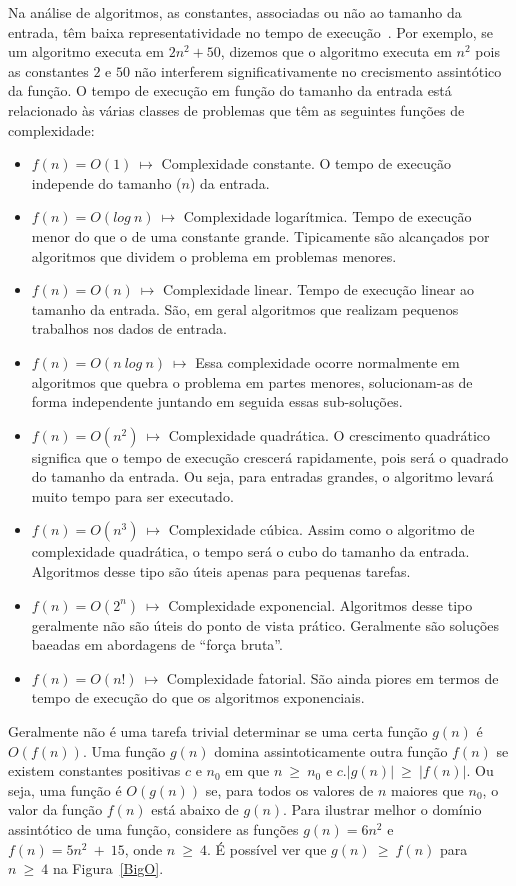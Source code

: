 \documentclass[11pt,fleqn]{book} %
\begin{document}
Na análise de algoritmos, as constantes, associadas ou não ao tamanho da entrada, têm baixa representatividade no tempo de execução~\cite{manber1989}.
Por exemplo, se um algoritmo executa em $2n^2+50$, dizemos que o algoritmo executa em $n^2$ pois as constantes $2$ e $50$ não interferem significativamente no crecismento assintótico da função.
O tempo de execução em função do tamanho da entrada está relacionado às várias classes de problemas que têm as seguintes funções de complexidade:
\begin{itemize}
\item $f(n) = O(1)~\mapsto$ Complexidade constante. O tempo de execução independe do tamanho ($n$) da entrada.
\item $f(n) = O(log~n)~\mapsto$ Complexidade logarítmica. Tempo de execução menor do que o de uma constante grande. Tipicamente são alcançados por algoritmos que dividem o problema em problemas menores.
\item $f(n) = O(n)~\mapsto$ Complexidade linear. Tempo de execução linear ao tamanho da entrada. São, em geral algoritmos que realizam pequenos trabalhos nos dados de entrada.
\item $f(n) = O(n~log~n)~\mapsto$ Essa complexidade ocorre normalmente em algoritmos que quebra o problema em partes menores, solucionam-as de forma independente juntando em seguida essas sub-soluções.
\item $f(n) = O(n^2)~\mapsto$ Complexidade quadrática. O crescimento quadrático significa que o tempo de execução crescerá rapidamente, pois será o quadrado do tamanho da entrada. Ou seja, para entradas grandes, o algoritmo levará muito tempo para ser executado.
\item $f(n) = O(n^3)~\mapsto$ Complexidade cúbica. Assim como o algoritmo de complexidade quadrática,  o tempo será o cubo do tamanho da entrada. Algoritmos desse tipo são úteis apenas para pequenas tarefas.
\item $f(n) = O(2^n)~\mapsto$ Complexidade exponencial. Algoritmos desse tipo geralmente não são úteis do ponto de vista prático. Geralmente são soluções baeadas em abordagens de ``força bruta''.
\item $f(n) = O(n!)~\mapsto$ Complexidade fatorial. São ainda piores em termos de tempo de execução do que os algoritmos exponenciais.
\end{itemize}

Geralmente não é uma tarefa trivial determinar se uma certa função $g(n)$ é $O(f(n))$.
Uma função $g(n)$ domina assintoticamente outra função $f(n)$ se existem constantes positivas $c$ e $n_0$ em que $n~\geq~n_0$ e $c.|g(n)|~\geq~|f(n)|$.
Ou seja, uma função é $O(g(n))$ se, para todos os valores de $n$ maiores que $n_0$, o valor da função $f(n)$ está abaixo de $g(n)$.
Para ilustrar melhor o domínio assintótico de uma função, considere as funções $g(n)=6n^2$ e $f(n) = 5n^2~+~15$, onde $n~\geq~4$. 
É possível ver que $g(n)~\geq~f(n)$ para $n~\geq~4$ na Figura~\ref{BigO}.
\end{document}

